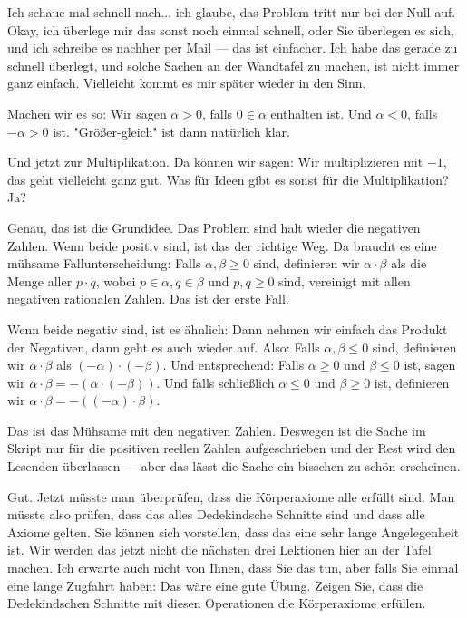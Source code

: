 \begin{spoken-clean}[00:44:52 - 00:46:05]
Ich schaue mal schnell nach... ich glaube, das Problem tritt nur bei der Null auf. Okay, ich überlege mir das sonst noch einmal schnell, oder Sie überlegen es sich, und ich schreibe es nachher per Mail --- das ist einfacher. Ich habe das gerade zu schnell überlegt, und solche Sachen an der Wandtafel zu machen, ist nicht immer ganz einfach. Vielleicht kommt es mir später wieder in den Sinn.

Machen wir es so: Wir sagen $\alpha > 0$, falls $0 \in \alpha$ enthalten ist. Und $\alpha < 0$, falls $-\alpha > 0$ ist. "Größer-gleich" ist dann natürlich klar.

Und jetzt zur Multiplikation. Da können wir sagen: Wir multiplizieren mit $-1$, das geht vielleicht ganz gut. Was für Ideen gibt es sonst für die Multiplikation? Ja?


Genau, das ist die Grundidee. Das Problem sind halt wieder die negativen Zahlen. Wenn beide positiv sind, ist das der richtige Weg. Da braucht es eine mühsame Fallunterscheidung: Falls $\alpha, \beta \ge 0$ sind, definieren wir $\alpha \cdot \beta$ als die Menge aller $p \cdot q$, wobei $p \in \alpha, q \in \beta$ und $p, q \ge 0$ sind, vereinigt mit allen negativen rationalen Zahlen. Das ist der erste Fall.
\end{spoken-clean}

\begin{spoken-clean}[00:46:05 - 00:49:12]
Wenn beide negativ sind, ist es ähnlich: Dann nehmen wir einfach das Produkt der Negativen, dann geht es auch wieder auf. Also: Falls $\alpha, \beta \le 0$ sind, definieren wir $\alpha \cdot \beta$ als $(-\alpha) \cdot (-\beta)$. Und entsprechend: Falls $\alpha \ge 0$ und $\beta \le 0$ ist, sagen wir $\alpha \cdot \beta = -(\alpha \cdot (-\beta))$. Und falls schließlich $\alpha \le 0$ und $\beta \ge 0$ ist, definieren wir $\alpha \cdot \beta = -((-\alpha) \cdot \beta)$.

Das ist das Mühsame mit den negativen Zahlen. Deswegen ist die Sache im Skript nur für die positiven reellen Zahlen aufgeschrieben und der Rest wird den Lesenden überlassen --- aber das lässt die Sache ein bisschen zu schön erscheinen.

Gut. Jetzt müsste man überprüfen, dass die Körperaxiome alle erfüllt sind. Man müsste also prüfen, dass das alles Dedekindsche Schnitte sind und dass alle Axiome gelten. Sie können sich vorstellen, dass das eine sehr lange Angelegenheit ist. Wir werden das jetzt nicht die nächsten drei Lektionen hier an der Tafel machen. Ich erwarte auch nicht von Ihnen, dass Sie das tun, aber falls Sie einmal eine lange Zugfahrt haben: Das wäre eine gute Übung. Zeigen Sie, dass die Dedekindschen Schnitte mit diesen Operationen die Körperaxiome erfüllen.
\end{spoken-clean}

